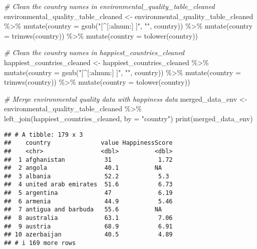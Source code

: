 \documentclass[
]{article}
\newenvironment{Shaded}{\begin{snugshade}}{\end{snugshade}}
\newcommand{\AttributeTok}[1]{\textcolor[rgb]{0.77,0.63,0.00}{#1}}
\newcommand{\CommentTok}[1]{\textcolor[rgb]{0.56,0.35,0.01}{\textit{#1}}}
\newcommand{\FunctionTok}[1]{\textcolor[rgb]{0.00,0.00,0.00}{#1}}
\newcommand{\NormalTok}[1]{#1}
\newcommand{\OtherTok}[1]{\textcolor[rgb]{0.56,0.35,0.01}{#1}}
\newcommand{\SpecialCharTok}[1]{\textcolor[rgb]{0.00,0.00,0.00}{#1}}
\newcommand{\StringTok}[1]{\textcolor[rgb]{0.31,0.60,0.02}{#1}}
\begin{document}
\begin{Shaded}
\begin{Highlighting}[]
\CommentTok{\# Clean the country names in environmental\_quality\_table\_cleaned}
\NormalTok{environmental\_quality\_table\_cleaned }\OtherTok{\textless{}{-}}\NormalTok{ environmental\_quality\_table\_cleaned }\SpecialCharTok{\%\textgreater{}\%}
  \FunctionTok{mutate}\NormalTok{(}\AttributeTok{country =} \FunctionTok{gsub}\NormalTok{(}\StringTok{"[\^{}[:alnum:] ]"}\NormalTok{, }\StringTok{""}\NormalTok{, country)) }\SpecialCharTok{\%\textgreater{}\%}  
  \FunctionTok{mutate}\NormalTok{(}\AttributeTok{country =} \FunctionTok{trimws}\NormalTok{(country)) }\SpecialCharTok{\%\textgreater{}\%}                  
  \FunctionTok{mutate}\NormalTok{(}\AttributeTok{country =} \FunctionTok{tolower}\NormalTok{(country))                     }

\CommentTok{\# Clean the country names in happiest\_countries\_cleaned}
\NormalTok{happiest\_countries\_cleaned }\OtherTok{\textless{}{-}}\NormalTok{ happiest\_countries\_cleaned }\SpecialCharTok{\%\textgreater{}\%}
  \FunctionTok{mutate}\NormalTok{(}\AttributeTok{country =} \FunctionTok{gsub}\NormalTok{(}\StringTok{"[\^{}[:alnum:] ]"}\NormalTok{, }\StringTok{""}\NormalTok{, country)) }\SpecialCharTok{\%\textgreater{}\%}  
  \FunctionTok{mutate}\NormalTok{(}\AttributeTok{country =} \FunctionTok{trimws}\NormalTok{(country)) }\SpecialCharTok{\%\textgreater{}\%}                    
  \FunctionTok{mutate}\NormalTok{(}\AttributeTok{country =} \FunctionTok{tolower}\NormalTok{(country))                     }

\CommentTok{\# Merge environmental quality data with happiness data}
\NormalTok{merged\_data\_env }\OtherTok{\textless{}{-}}\NormalTok{ environmental\_quality\_table\_cleaned }\SpecialCharTok{\%\textgreater{}\%}
  \FunctionTok{left\_join}\NormalTok{(happiest\_countries\_cleaned, }\AttributeTok{by =} \StringTok{"country"}\NormalTok{)}
\FunctionTok{print}\NormalTok{(merged\_data\_env)}
\end{Highlighting}
\end{Shaded}

\begin{verbatim}
## # A tibble: 179 x 3
##    country              value HappinessScore
##    <chr>                <dbl>          <dbl>
##  1 afghanistan           31             1.72
##  2 angola                40.1          NA   
##  3 albania               52.2           5.3 
##  4 united arab emirates  51.6           6.73
##  5 argentina             47             6.19
##  6 armenia               44.9           5.46
##  7 antigua and barbuda   55.6          NA   
##  8 australia             63.1           7.06
##  9 austria               68.9           6.91
## 10 azerbaijan            40.5           4.89
## # i 169 more rows
\end{verbatim}
\end{document}
